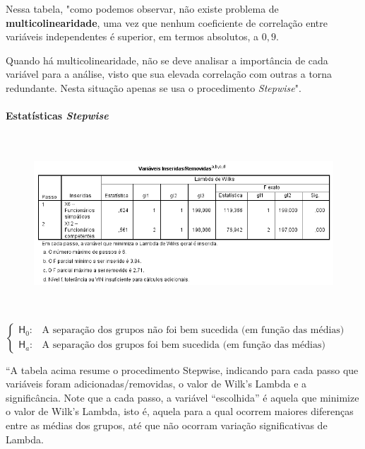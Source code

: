 				Nessa tabela, "como podemos observar, não existe problema de \textbf{multicolinearidade}, uma vez que nenhum coeficiente de correlação entre variáveis independentes é superior, em termos absolutos, a $0,9$.

				Quando há multicolinearidade, não se deve analisar a importância de cada variável para a análise, visto que sua elevada correlação com outras a torna redundante. Nesta situação apenas se usa o procedimento \textit{Stepwise}".
				
			\paragraph{Estatísticas \textit{Stepwise}} \hspace{0cm}

				\begin{figure}[H]
					\centering
					\includegraphics[height=6.5cm]{images/analise-discriminante_stepwise_var-inseridas-removidas}
				\end{figure}

				$
					\begin{cases}

					\mathsf{H}_{0} : & \text{A separação dos grupos não foi bem sucedida (em função das médias)} \\
					\mathsf{H}_{a} : & \text{A separação dos grupos foi bem sucedida (em função das médias)}

					\end{cases}
				$

				\bigskip \bigskip

				``A tabela acima resume o procedimento Stepwise, indicando para cada passo que variáveis foram adicionadas/removidas, o valor de Wilk’s Lambda e a significância. Note que a cada passo, a variável “escolhida” é aquela que minimize o valor de Wilk’s Lambda, isto é, aquela para a qual ocorrem maiores diferenças entre as médias dos grupos, até que não ocorram variação significativas de Lambda.

